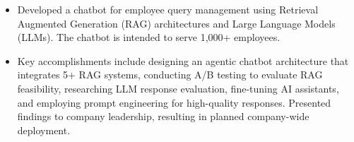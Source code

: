\documentclass[letterpaper,10pt]{article}
\makeatletter
\newcommand\indentsize{10pt}
\newcommand{\resumeItem}[1]{
  \item\small{
    {#1 \vspace{-2pt}}
  }
}
\newcommand{\resumeSubheading}[4]{
    \item\vspace{-2pt}
    \begin{tabular*}{0.97\textwidth}[t]{l@{\extracolsep{\fill}}r}
      \textbf{#1} & #2 \\
      #3 & #4 \\
    \end{tabular*}%
}
\newcommand{\resumeSubSubheading}[2]{
    \item \normalsize
    \begin{tabular*}{0.97\textwidth}{l@{\extracolsep{\fill}}r}
      #1 & #2 \\
    \end{tabular*}\vspace{-7pt}
}
\newcommand{\resumeItemListStart}{\begin{itemize}[leftmargin=\indentsize, label=-]\vspace{-7pt}}
\newcommand{\resumeItemListEnd}{\end{itemize}\vspace{-5pt}}
\makeatother
\begin{document}
        \resumeItemListStart
            \resumeItem{Developed a chatbot for employee query management using Retrieval Augmented Generation (RAG) architectures and Large Language Models (LLMs). The chatbot is intended to serve 1,000+ employees.}
            \resumeItem{Key accomplishments include designing an agentic chatbot architecture that integrates 5+ RAG systems, conducting A/B testing to evaluate RAG feasibility, researching LLM response evaluation, fine-tuning AI assistants, and employing prompt engineering for high-quality responses. Presented findings to company leadership, resulting in planned company-wide deployment.}
        \resumeItemListEnd

\end{document}
